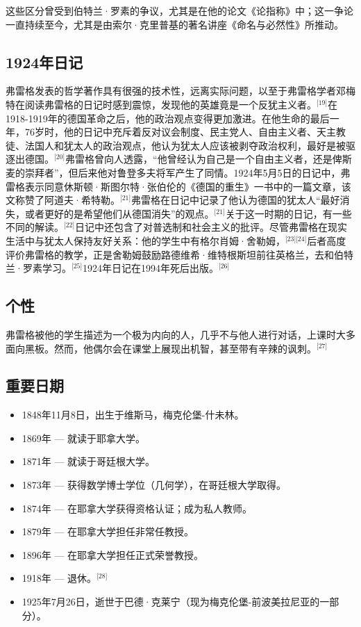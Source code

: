 这些区分曾受到伯特兰·罗素的争议，尤其是在他的论文《论指称》中；这一争论一直持续至今，尤其是由索尔·克里普基的著名讲座《命名与必然性》所推动。
\subsection{1924年日记}
弗雷格发表的哲学著作具有很强的技术性，远离实际问题，以至于弗雷格学者邓梅特在阅读弗雷格的日记时感到震惊，发现他的英雄竟是一个反犹主义者。\(^\text{[19]}\)在1918-1919年的德国革命之后，他的政治观点变得更加激进。在他生命的最后一年，76岁时，他的日记中充斥着反对议会制度、民主党人、自由主义者、天主教徒、法国人和犹太人的政治观点，他认为犹太人应该被剥夺政治权利，最好是被驱逐出德国。\(^\text{[20]}\)弗雷格曾向人透露，“他曾经认为自己是一个自由主义者，还是俾斯麦的崇拜者”，但后来他对鲁登多夫将军产生了同情。1924年5月5日的日记中，弗雷格表示同意休斯顿·斯图尔特·张伯伦的《德国的重生》一书中的一篇文章，该文称赞了阿道夫·希特勒。\(^\text{[21]}\)弗雷格在日记中记录了他认为德国的犹太人“最好消失，或者更好的是希望他们从德国消失”的观点。\(^\text{[21]}\)关于这一时期的日记，有一些不同的解读。\(^\text{[22]}\)日记中还包含了对普选制和社会主义的批评。尽管弗雷格在现实生活中与犹太人保持友好关系：他的学生中有格尔肖姆·舍勒姆，\(^\text{[23][24]}\)后者高度评价弗雷格的教学，正是舍勒姆鼓励路德维希·维特根斯坦前往英格兰，去和伯特兰·罗素学习。\(^\text{[25]}\)1924年日记在1994年死后出版。\(^\text{[26]}\)
\subsection{个性}
弗雷格被他的学生描述为一个极为内向的人，几乎不与他人进行对话，上课时大多面向黑板。然而，他偶尔会在课堂上展现出机智，甚至带有辛辣的讽刺。\(^\text{[27]}\)
\subsection{重要日期}  
\begin{itemize}
\item 1848年11月8日，出生于维斯马，梅克伦堡-什未林。  
\item 1869年 — 就读于耶拿大学。  
\item 1871年 — 就读于哥廷根大学。  
\item 1873年 — 获得数学博士学位（几何学），在哥廷根大学取得。  
\item 1874年 — 在耶拿大学获得资格认证；成为私人教师。  
\item 1879年 — 在耶拿大学担任非常任教授。  
\item 1896年 — 在耶拿大学担任正式荣誉教授。  
\item 1918年 — 退休。\(^\text{[28]}\) 
\item 1925年7月26日，逝世于巴德·克莱宁（现为梅克伦堡-前波美拉尼亚的一部分）。
\end{itemize}
